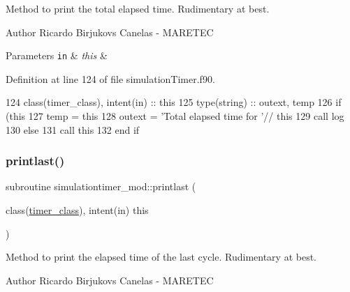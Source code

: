 Method to print the total elapsed time. Rudimentary at best. 

\begin{DoxyAuthor}{Author}
Ricardo Birjukovs Canelas -\/ M\+A\+R\+E\+T\+EC 
\end{DoxyAuthor}

\begin{DoxyParams}[1]{Parameters}
\mbox{\tt in}  & {\em this} & \\
\hline
\end{DoxyParams}


Definition at line 124 of file simulation\+Timer.\+f90.


\begin{DoxyCode}
124     \textcolor{keywordtype}{class}(timer\_class), \textcolor{keywordtype}{intent(in)} :: this
125     \textcolor{keywordtype}{type}(string) :: outext, temp
126     \textcolor{keywordflow}{if} (this%
127         temp = this%
128         outext = \textcolor{stringliteral}{'Total elapsed time for '}// this%
129         \textcolor{keyword}{call }log%
130     \textcolor{keywordflow}{else}
131         \textcolor{keyword}{call }this%
132 \textcolor{keywordflow}{    end if}    
\end{DoxyCode}
\mbox{\label{namespacesimulationtimer__mod_ae6e0d8f98a24587daf93cedb4e93ad79}} 
\subsubsection{\texorpdfstring{printlast()}{printlast()}}
{\footnotesize\ttfamily subroutine simulationtimer\+\_\+mod\+::printlast (\begin{DoxyParamCaption}\item[{class(\mbox{\hyperlink{structsimulationtimer__mod_1_1timer__class}{timer\+\_\+class}}), intent(in)}]{this }\end{DoxyParamCaption})\hspace{0.3cm}{\ttfamily [private]}}



Method to print the elapsed time of the last cycle. Rudimentary at best. 

\begin{DoxyAuthor}{Author}
Ricardo Birjukovs Canelas -\/ M\+A\+R\+E\+T\+EC 
\end{DoxyAuthor}

